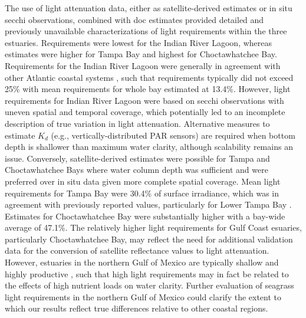 \documentclass[letterpaper,12pt,oneside]{article}\usepackage[]{graphicx}\usepackage[]{color}
\begin{document}
The use of light attenuation data, either as satellite-derived estimates or in situ secchi observations, combined with \ac{doc} estimates provided detailed and previously unavailable characterizations of light requirements within the three estuaries.  Requirements were lowest for the Indian River Lagoon, whereas estimates were higher for Tampa Bay and highest for Choctawhatchee Bay. Requirements for the Indian River Lagoon were generally in agreement with other Atlantic coastal systems \citep{Dennison93,Kemp04}, such that requirements typically did not exceed 25\% with mean requirements for whole bay estimated at 13.4\%.  However, light requirements for Indian River Lagoon were based on secchi observations with uneven spatial and temporal coverage, which potentially led to an incomplete description of true variation in light attenuation.  Alternative measures to estimate $K_d$ (e.g., vertically-distributed PAR sensors) are required when bottom depth is shallower than maximum water clarity, although scalability remains an issue.  Conversely, satellite-derived estimates were possible for Tampa and Choctawhatchee Bays where water column depth was sufficient and were preferred over in situ data given more complete spatial coverage. Mean light requirements for Tampa Bay were 30.4\% of surface irradiance, which was in agreement with previously reported values, particularly for Lower Tampa Bay \citep{Dixon95}.  Estimates for Choctawhatchee Bay were substantially higher with a bay-wide average of 47.1\%.  The relatively higher light requirements for Gulf Coast esuaries, particularly Choctawhatchee Bay, may reflect the need for additional validation data for the conversion of satellite reflectance values to light attenuation.  However, estuaries in the northern Gulf of Mexico are typically shallow and highly productive \citep{Caffrey14}, such that high light requirements may in fact be related to the effects of high nutrient loads on water clarity.  Further evaluation of seagrass light requirements in the northern Gulf of Mexico could clarify the extent to which our results reflect true differences relative to other coastal regions.
\end{document}
